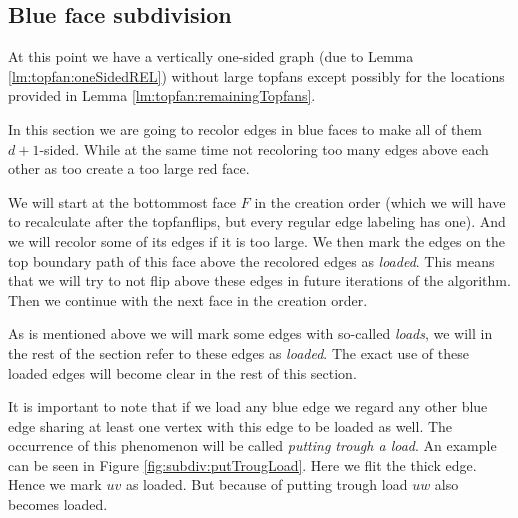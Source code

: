 
\subsection{Blue face subdivision}
\thispagestyle{plain}
\label{ss:subdiv}
At this point we have a vertically one-sided graph (due to Lemma \ref{lm:topfan:oneSidedREL}) without large topfans except possibly for the locations provided in Lemma \ref{lm:topfan:remainingTopfans}.

In this section we are going to recolor edges in blue faces to make all of them $d+1$-sided. While at the same time not recoloring too many edges above each other as too create a too large red face.

We will start at the bottommost face $F$ in the creation order (which we will have to recalculate after the topfanflips, but every regular edge labeling has one). And we will recolor some of its edges if it is too large. 
We then mark the edges on the top boundary path of this face above the recolored edges as \emph{loaded}. This means that we will try to not flip above these edges in future iterations of the algorithm.
Then we continue with the next face in the creation order.

As is mentioned above we will mark some edges with so-called \emph{loads}, we will in the rest of the section refer to these edges as \emph{loaded}.
The exact use of these loaded edges will become clear in the rest of this section.

It is important to note that if we load any blue edge we regard any other blue edge sharing at least one vertex with this edge to be loaded as well. The occurrence of this phenomenon will be called \emph{putting trough a load}. An example can be seen in Figure \ref{fig:subdiv:putTrougLoad}. Here we flit the thick edge. Hence we mark $uv$ as loaded. But because of putting trough load $uw$ also becomes loaded.

